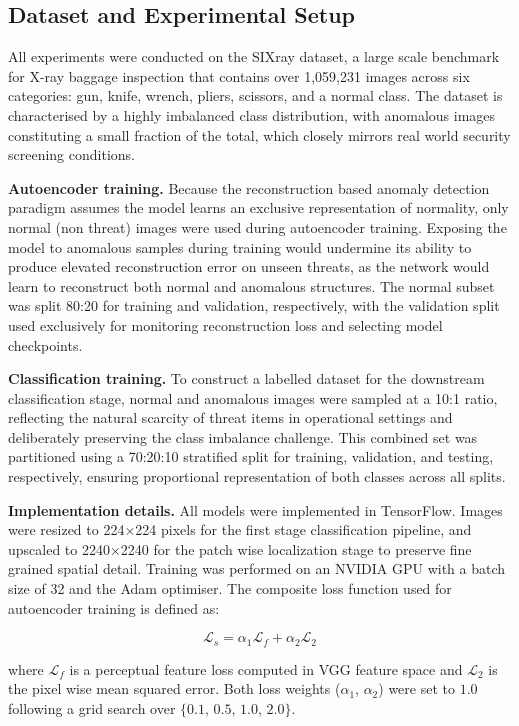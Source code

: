 \documentclass{bmvc2k}
\begin{document}
\subsection{Dataset and Experimental Setup}

All experiments were conducted on the SIXray dataset, a large scale benchmark for X-ray baggage inspection that contains over 1,059,231 images across six categories: gun, knife, wrench, pliers, scissors, and a normal class. The dataset is characterised by a highly imbalanced class distribution, with anomalous images constituting a small fraction of the total, which closely mirrors real world security screening conditions.

\textbf{Autoencoder training.} Because the reconstruction based anomaly detection paradigm assumes the model learns an exclusive representation of normality, only normal (non threat) images were used during autoencoder training. Exposing the model to anomalous samples during training would undermine its ability to produce elevated reconstruction error on unseen threats, as the network would learn to reconstruct both normal and anomalous structures. The normal subset was split 80:20 for training and validation, respectively, with the validation split used exclusively for monitoring reconstruction loss and selecting model checkpoints.

\textbf{Classification training.} To construct a labelled dataset for the downstream classification stage, normal and anomalous images were sampled at a 10:1 ratio, reflecting the natural scarcity of threat items in operational settings and deliberately preserving the class imbalance challenge. This combined set was partitioned using a 70:20:10 stratified split for training, validation, and testing, respectively, ensuring proportional representation of both classes across all splits.

\textbf{Implementation details.} All models were implemented in TensorFlow. Images were resized to 224×224 pixels for the first stage classification pipeline, and upscaled to 2240×2240 for the patch wise localization stage to preserve fine grained spatial detail. Training was performed on an NVIDIA GPU with a batch size of 32 and the Adam optimiser. The composite loss function used for autoencoder training is defined as:

\[
\mathcal{L}_s = \alpha_1 \mathcal{L}_f + \alpha_2 \mathcal{L}_2
\]

where $\mathcal{L}_f$ is a perceptual feature loss computed in VGG feature space and $\mathcal{L}_2$ is the pixel wise mean squared error. Both loss weights ($\alpha_1$, $\alpha_2$) were set to $1.0$ following a grid search over $\{0.1,\,0.5,\,1.0,\,2.0\}$.
\end{document}

